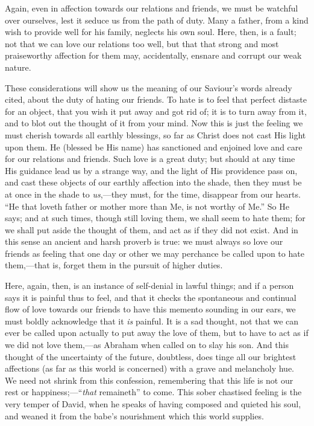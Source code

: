 Again, even in affection towards our relations and friends, we must
be watchful over ourselves, lest it seduce us from the path of duty.
Many a father, from a kind wish to provide well for his family,
neglects his own soul. Here, then, is a fault; not that we can love
our relations too well, but that that strong and most praiseworthy
affection for them may, accidentally, ensnare and corrupt our weak
nature.

These considerations will show us the meaning of our Saviour's
words already cited, about the duty of hating our friends. To hate is
to feel that perfect distaste for an object, that you wish it put away
and got rid of; it is to turn away from it, and to blot out the
thought of it from your mind. Now this is just the feeling we must
cherish towards all earthly blessings, so far as Christ does not cast
His light upon them. He (blessed be His name) has sanctioned and
enjoined love and care for our relations and friends. Such love is a
great duty; but should at any time His guidance lead us by a strange
way, and the light of His providence pass on, and cast these objects
of our earthly affection into the shade, then they must be at once in
the shade to \emph{us},—they must, for the time, disappear from our
hearts. ``He that loveth father or mother more than Me, is not
worthy of Me.'' So He says; and at such times, though still loving
them, we shall seem to hate them; for we shall put aside the thought
of them, and act as if they did not exist. And in this sense an
ancient and harsh proverb is true: we must always so love our friends
as feeling that one day or other we may perchance be called upon to
hate them,—that is, forget them in the pursuit of higher duties.

Here, again, then, is an instance of self-denial in lawful things;
and if a person says it is painful thus to feel, and that it checks
the spontaneous and continual flow of love towards our friends to have
this memento sounding in our ears, we must boldly acknowledge that it \emph{is}
painful. It is a sad thought, not that we can ever be called upon
actually to put away the love of them, but to have to act as if we did
not love them,—as Abraham when called on to slay his son. And this
thought of the uncertainty of the future, doubtless, does tinge all
our brightest affections (as far as this world is concerned) with a
grave and melancholy hue. We need not shrink from this confession,
remembering that this life is not our rest or happiness;—``\emph{that}
remaineth'' to come. This sober chastised feeling is the very
temper of David, when he speaks of having composed and quieted his
soul, and weaned it from the babe's nourishment which this world
supplies.

